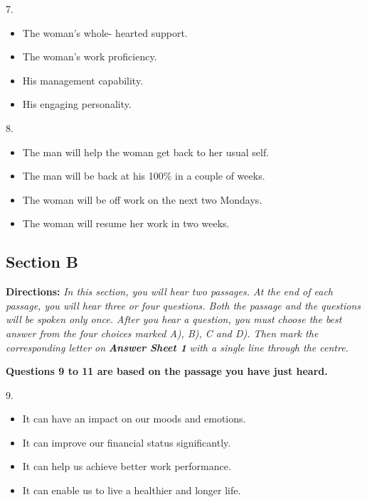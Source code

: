 \documentclass[UTF8,11pt]{ctexart}
\begin{document}
7.


\begin{itemize}[leftmargin=2em,itemsep=.2em,topsep=.4em]\item[A.] The woman’s whole- hearted support.
\item[B.] The woman’s work proficiency.
\item[C.] His management capability.
\item[D.] His engaging personality.
\end{itemize}

8.


\begin{itemize}[leftmargin=2em,itemsep=.2em,topsep=.4em]\item[A.] The man will help the woman get back to her usual self.
\item[B.] The man will be back at his 100\% in a couple of weeks.
\item[C.] The woman will be off work on the next two Mondays.
\item[D.] The woman will resume her work in two weeks.
\end{itemize}

\subsection*{\textbf{Section B}}


\textbf{Directions:} \textit{In this section, you will hear two passages. At the end of each passage, you will hear three or four} \textit{questions. Both the passage and the questions will be spoken only once. After you hear a question, you must} \textit{choose the best answer from the four choices marked A), B), C and D). Then mark the corresponding letter on} \textbf{\textit{Answer Sheet 1}}\textit{ with a single line through the centre.}


\textbf{Questions 9 to 11 are based on the passage you have just heard.}


9.


\begin{itemize}[leftmargin=2em,itemsep=.2em,topsep=.4em]\item[A.] It can have an impact on our moods and emotions.
\item[B.] It can improve our financial status significantly.
\item[C.] It can help us achieve better work performance.
\item[D.] It can enable us to live a healthier and longer life.
\end{itemize}
\end{document}
